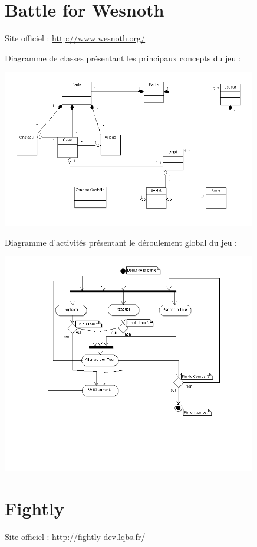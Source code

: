 \documentclass[a4paper,10pt]{report}
\begin{document}
	\section{Battle for Wesnoth}
	
    Site officiel : \url{http://www.wesnoth.org/}
    
    Diagramme de classes présentant les principaux concepts du jeu : 
    
		\includegraphics[width=420px]{diagrammes/Concept-Battle-of-Wesnoth.png}

    Diagramme d'activités présentant le déroulement global du jeu : 
    
    \includegraphics[width=420px]{diagrammes/Diagramme_Activites_BoW.png}
    

	\section{Fightly}
	
    Site officiel : \url{http://fightly-dev.lqbs.fr/}
\end{document}
